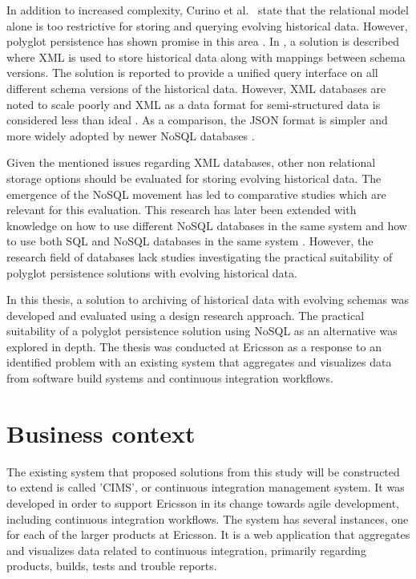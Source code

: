 In addition to increased complexity, Curino et al.\ \cite{Moon09} state that the relational model alone is too restrictive for storing and querying evolving historical data. However, polyglot persistence has shown promise in this area \cite{Moon05, Moon09, MoonPHD}. In \cite{Moon09}, a solution is described where XML is used to store historical data along with mappings between schema versions. The solution is reported to provide a unified query interface on all different schema versions of the historical data. However, XML databases are noted to scale poorly \cite{Moon09} and XML as a data format for semi-structured data is considered less than ideal \cite{JSONData}. As a comparison, the JSON format is simpler \cite{JSONData} and more widely adopted by newer NoSQL databases \cite{Catell}.

Given the mentioned issues regarding XML databases, other non relational storage options should be evaluated for storing evolving historical data. The emergence of the NoSQL movement has led to comparative studies \cite{Catell, NoSQLSurvey} which are relevant for this evaluation. This research has later been extended with knowledge on how to use different NoSQL databases in the same system \cite{NoSQLDistilled} and how to use both SQL and NoSQL databases in the same system \cite{MySQLToNoSQL}. However, the research field of databases lack studies investigating the practical suitability of polyglot persistence solutions with evolving historical data.

In this thesis, a solution to archiving of historical data with evolving schemas was developed and evaluated using a design research approach. The practical suitability of a polyglot persistence solution using NoSQL as an alternative was explored in depth. The thesis was conducted at Ericsson as a response to an identified problem with an existing system that aggregates and visualizes data from software build systems and continuous integration workflows.

\section{Business context}
The existing system that proposed solutions from this study will be constructed to extend is called 'CIMS', or continuous integration management system. It was developed in order to support Ericsson in its change towards agile development, including continuous integration workflows. The system has several instances, one for each of the larger products at Ericsson. It is a web application that aggregates and visualizes data related to continuous integration, primarily regarding products, builds, tests and trouble reports.

